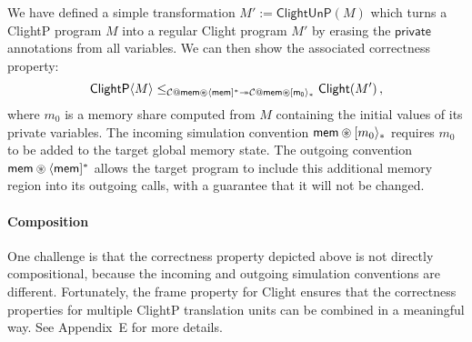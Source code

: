 \documentclass[acmsmall,nonacm]{acmart}
\newcommand{\kw}[1]{\ensuremath{ \mathsf{#1} }}
\newcommand{\sepconj}{\oast}
\begin{document}
We have defined a simple transformation $M' := \kw{ClightUnP}(M)$
which turns a ClightP program $M$ into a regular Clight program $M'$
by erasing the $\kw{private}$ annotations from all variables.
We can then show the associated correctness property:
\[
  \kw{ClightP}\langle M \rangle \le_{
    \mathcal{C} \mathbin@ \kw{mem} \sepconj \langle \kw{mem} ]^*
    \twoheadrightarrow
    \mathcal{C} \mathbin@ \kw{mem} \sepconj [ \kw{m_0} \rangle_*}
  \kw{Clight}(M')
  \,,
\]
where $m_0$ is a memory share computed from $M$
containing the initial values of its private variables.
The incoming simulation convention $\kw{mem} \sepconj [m_0\rangle_*$
requires $m_0$ to be added to the target global memory state.
The outgoing convention $\kw{mem} \sepconj \langle \kw{mem} ]^*$
allows the target program to include this additional memory region
into its outgoing calls,
with a guarantee that it will not be changed.



\paragraph{Composition}

One challenge is that the correctness property depicted above
is not directly compositional,
because the incoming and outgoing simulation conventions are different.
Fortunately,
the frame property for Clight ensures that
the correctness properties for multiple ClightP translation units
can be combined in a meaningful way.
See Appendix~E \citep{compcertoe-tr} for more details. %

\end{document}
